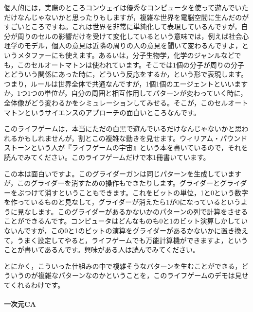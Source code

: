 \documentclass{ltjsbook}
\begin{document}
個人的には，実際のところコンウェイは優秀なコンピュータを使って遊んでいただけなんじゃないかと思ったりもしますが，複雑な世界を電脳空間に生んだのがすごいところですね。これは世界を非常に単純化して表現しているんですが，自分が周りのセルの影響だけを受けて変化しているという意味では，例えば社会心理学のモデル，個人の意見は近隣の周りの人の意見を聞いて変わるんですよ，というメタファーにも使えます。あるいは，分子生物学，化学のジャンルなどでも，このセルオートマトンは使われています。そこでは1個の分子が周りの分子とどういう関係にあった時に，どういう反応をするか，という形で表現します。つまり，ルールは世界全体で共通なんですが，1個1個のエージェントといいますか，1つ1つの単位が，自分の周囲と相互作用してパターンが変わっていく時に，全体像がどう変わるかをシミュレーションしてみせる。そこが，このセルオートマトンというサイエンスのアプローチの面白いところなんです。

このライフゲームは，本当にただの白黒で遊んでいるだけなんじゃないかと思われるかもしれませんが，割とこの複雑な動きを見せます。ウィリアム・パウンドストーンという人が『ライフゲームの宇宙』という本\parencite{LifegaeNoUchu}を書いているので，それを読んでみてください。このライフゲームだけで本1冊書いています。

この本は面白いですよ。このグライダーガンは同じパターンを生成していますが，このグライダーを消すための操作もできたりします。グライダーとグライダーをぶつけて消すということもできます。これをビットの単位，1と0という数字を作っているものと見なして，グライダーが消えたら1が0になっているというように見なします。このグライダーがあるかないかのパターンの列で計算をさせることができるんです。コンピュータはどんなものも0と1のビット演算しかしていないんですが，この0と1のビットの演算をグライダーがあるかないかに置き換えて，うまく設定してやると，ライフゲームでも万能計算機ができますよ，ということが書いてあるんです。興味がある人は読んでみてください。

とにかく，こういった仕組みの中で複雑そうなパターンを生むことができる，どういうのが複雑なパターンなのかということを，このライフゲームのデモは見せてくれるわけです。

\paragraph{一次元CA}
\end{document}
